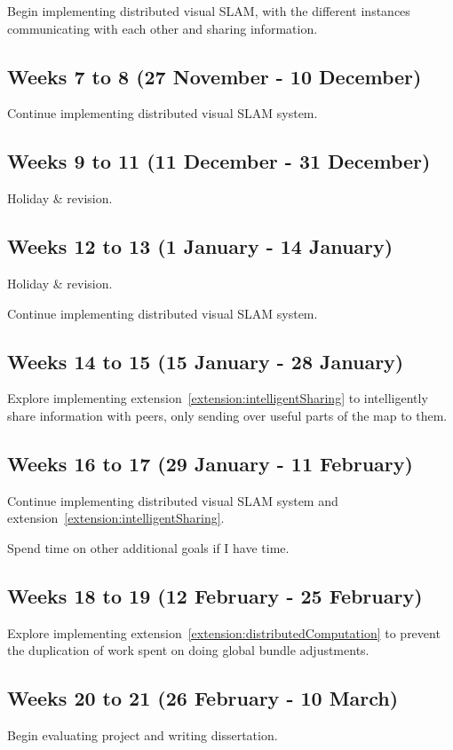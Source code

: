 \documentclass[12pt,a4paper,twoside]{article}
\begin{document}
Begin implementing distributed visual SLAM, with the different instances communicating with each other and sharing information.

\subsection*{Weeks 7 to 8 (27 November - 10 December)}
Continue implementing distributed visual SLAM system.

\subsection*{Weeks 9 to 11 (11 December - 31 December)}
Holiday \& revision.

\subsection*{Weeks 12 to 13 (1 January - 14 January)}
Holiday \& revision.

Continue implementing distributed visual SLAM system. 

\subsection*{Weeks 14 to 15 (15 January - 28 January)}
Explore implementing extension~\ref{extension:intelligentSharing} to intelligently share information with peers, only sending over useful parts of the map to them.

\subsection*{Weeks 16 to 17 (29 January - 11 February)}
Continue implementing distributed visual SLAM system and extension~\ref{extension:intelligentSharing}. 

Spend time on other additional goals if I have time. 

\subsection*{Weeks 18 to 19 (12 February - 25 February)}
Explore implementing extension~\ref{extension:distributedComputation} to prevent the duplication of work spent on doing global bundle adjustments.

\subsection*{Weeks 20 to 21 (26 February - 10 March)}
Begin evaluating project and writing dissertation.
\end{document}
